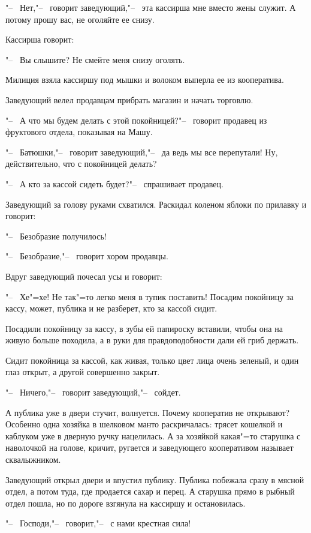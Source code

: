 "--~ Нет,"--~ говорит заведующий,"--~ эта кассирша мне вместо жены служит. А потому прошу вас, не оголяйте ее снизу.
 
Кассирша говорит:
 
"--~ Вы слышите? Не смейте меня снизу оголять.
 
Милиция взяла кассиршу под мышки и волоком выперла ее из кооператива.
 
Заведующий велел продавцам прибрать магазин и начать торговлю.
 
"--~ А что мы будем делать с этой покойницей?"--~ говорит продавец из фруктового отдела, показывая на Машу.

"--~ Батюшки,"--~ говорит заведующий,"--~ да ведь мы все перепутали! Ну, действительно, что с покойницей делать?
 
"--~ А кто за кассой сидеть будет?"--~ спрашивает продавец.
 
Заведующий за голову руками схватился. Раскидал коленом яблоки по прилавку и говорит:
 
"--~ Безобразие получилось!
 
"--~ Безобразие,"--~ говорит хором продавцы.
 
Вдруг заведующий почесал усы и говорит:
 
"--~ Хе"=хе! Не так"=то легко меня в тупик поставить! Посадим покойницу за кассу, может, публика и не разберет, кто за кассой сидит.
 
Посадили покойницу за кассу, в зубы ей папироску вставили, чтобы она на живую больше походила, а в руки для правдоподобности дали ей гриб держать.
 
Сидит покойница за кассой, как живая, только цвет лица очень зеленый, и один глаз открыт, а другой совершенно закрыт.
 
"--~ Ничего,"--~ говорит заведующий,"--~ сойдет.
 
А публика уже в двери стучит, волнуется. Почему кооператив не открывают? Особенно одна хозяйка в шелковом манто раскричалась: трясет кошелкой и каблуком уже в дверную ручку нацелилась. А за хозяйкой какая"=то старушка с наволочкой на голове, кричит, ругается и заведующего кооперативом называет сквалыжником.
 
Заведующий открыл двери и впустил публику. Публика побежала сразу в мясной отдел, а потом туда, где продается сахар и перец. А старушка прямо в рыбный отдел пошла, но по дороге взгянула на кассиршу и остановилась.
 
"--~ Господи,"--~ говорит,"--~ с нами крестная сила!
 

